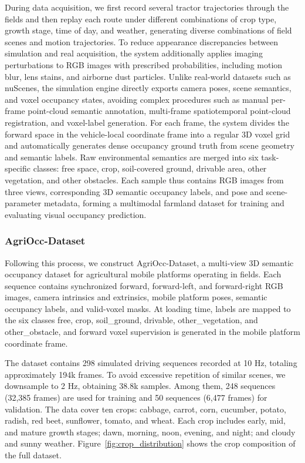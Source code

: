 \documentclass[a4paper,fleqn]{cas-sc}
\begin{document}
During data acquisition, we first record several tractor trajectories through the fields and then replay each route under different combinations of crop type, growth stage, time of day, and weather, generating diverse combinations of field scenes and motion trajectories.
To reduce appearance discrepancies between simulation and real acquisition, the system additionally applies imaging perturbations to RGB images with prescribed probabilities, including motion blur, lens stains, and airborne dust particles.
Unlike real-world datasets such as nuScenes, the simulation engine directly exports camera poses, scene semantics, and voxel occupancy states, avoiding complex procedures such as manual per-frame point-cloud semantic annotation, multi-frame spatiotemporal point-cloud registration, and voxel-label generation.
For each frame, the system divides the forward space in the vehicle-local coordinate frame into a regular 3D voxel grid and automatically generates dense occupancy ground truth from scene geometry and semantic labels.
Raw environmental semantics are merged into six task-specific classes: free space, crop, soil-covered ground, drivable area, other vegetation, and other obstacles.
Each sample thus contains RGB images from three views, corresponding 3D semantic occupancy labels, and pose and scene-parameter metadata, forming a multimodal farmland dataset for training and evaluating visual occupancy prediction.

\subsubsection{AgriOcc-Dataset}\label{sec:agriocc_dataset}
Following this process, we construct AgriOcc-Dataset, a multi-view 3D semantic occupancy dataset for agricultural mobile platforms operating in fields.
Each sequence contains synchronized forward, forward-left, and forward-right RGB images, camera intrinsics and extrinsics, mobile platform poses, semantic occupancy labels, and valid-voxel masks.
At loading time, labels are mapped to the six classes free, crop, soil\_ground, drivable, other\_vegetation, and other\_obstacle, and forward voxel supervision is generated in the mobile platform coordinate frame.

 
The dataset contains 298 simulated driving sequences recorded at 10 Hz, totaling approximately 194k frames.
To avoid excessive repetition of similar scenes, we downsample to 2 Hz, obtaining 38.8k samples. Among them, 248 sequences (32,385 frames) are used for training and 50 sequences (6,477 frames) for validation.
The data cover ten crops: cabbage, carrot, corn, cucumber, potato, radish, red beet, sunflower, tomato, and wheat. Each crop includes early, mid, and mature growth stages; dawn, morning, noon, evening, and night; and cloudy and sunny weather. Figure~\ref{fig:crop_distribution} shows the crop composition of the full dataset.
\end{document}
